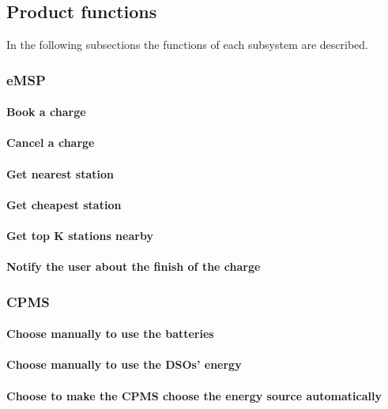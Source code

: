 \subsection{Product functions}
In the following subsections the functions of each subsystem are described.


\subsubsection{\ac{eMSP}}
\paragraph{Book a charge}
\paragraph{Cancel a charge}
\paragraph{Get nearest station}
\paragraph{Get cheapest station}
\paragraph{Get top K stations nearby}
\paragraph{Notify the user about the finish of the charge}

\subsubsection{\ac{CPMS}}
\paragraph{Choose manually to use the batteries}
\paragraph{Choose manually to use the \acp{DSO}' energy}
\paragraph{Choose to make the \ac{CPMS} choose the energy source automatically}
